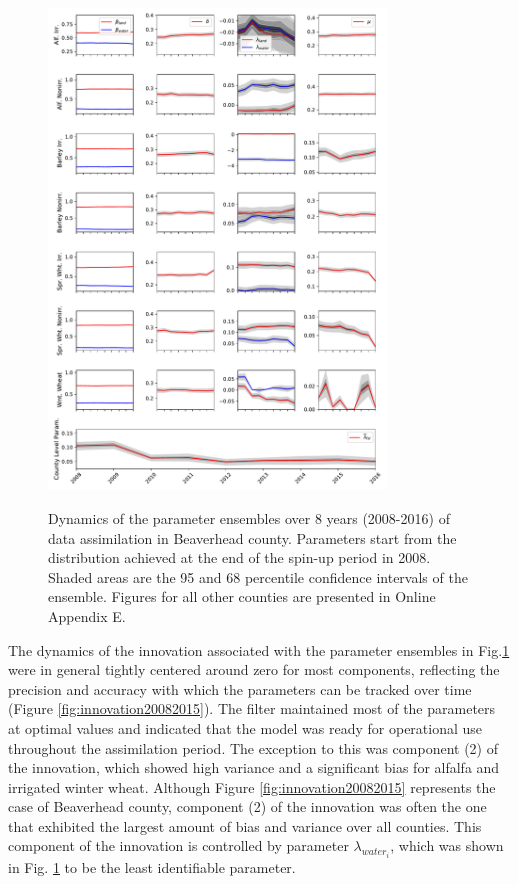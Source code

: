 \begin{figure}
\includegraphics[width=0.8\textwidth]{Figures/cal_Beaverhead.pdf}
\label{fig:calibration2008-2015}
\caption{Dynamics of the parameter ensembles over 8 years (2008-2016) of data assimilation in Beaverhead county. Parameters start from the distribution achieved at the end of the spin-up period in 2008. Shaded areas are the 95 and 68 percentile confidence intervals of the ensemble. Figures for all other counties are presented in Online Appendix E. }
\end{figure}

The dynamics of the innovation associated with the parameter ensembles in Fig.\ref{fig:calibration2008-2015} were in general tightly centered around zero for most components, reflecting the precision and accuracy with which the parameters can be tracked over time (Figure \ref{fig:innovation20082015}). The filter maintained most of the parameters at optimal values and indicated that the model was ready for operational use throughout the assimilation period. The exception to this was component (2) of the innovation, which showed high variance and a significant bias for alfalfa and irrigated winter wheat. Although Figure \ref{fig:innovation20082015} represents the case of Beaverhead county, component (2) of the innovation was often the one that exhibited the largest amount of bias and variance over all counties. This component of the innovation is controlled by parameter $\lambda_{water_i}$, which was shown in Fig. \ref{fig:calibration2008-2015} to be the least identifiable parameter.  

